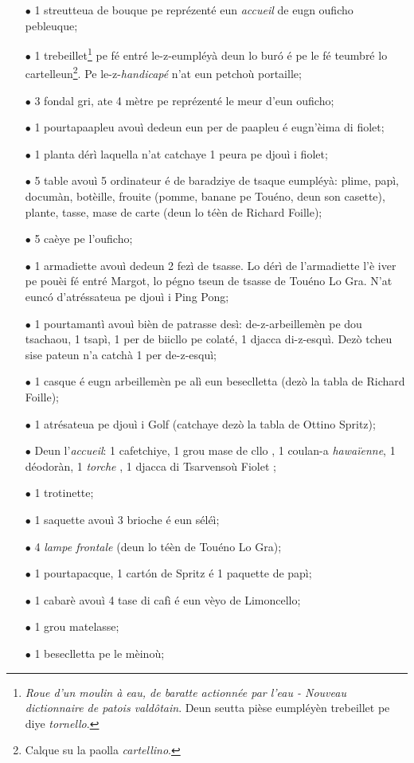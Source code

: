 \Scenographie
\begin{itemize}
\item[$\bullet$] 1 streutteua de bouque pe reprézenté eun \textit{accueil} de eugn ouficho pebleuque;
\item[$\bullet$] 1 trebeillet\footnote{ \textit{Roue d'un moulin à eau, de baratte actionnée par l'eau - Nouveau dictionnaire de patois vald\^otain}. Deun seutta pièse eumpléyèn trebeillet pe diye \textit{tornello}.} pe fé entré le-z-eumpléyà deun lo bur\'o é pe le fé teumbré lo cartelleun\footnote{ Calque su la paolla \textit{cartellino}.}. Pe le-z-\textit{handicapé} n'at eun petchoù portaille;
\item[$\bullet$] 3 fondal gri, ate 4 mètre pe reprézenté le meur d'eun ouficho;
\item[$\bullet$] 1 pourtapaapleu avouì dedeun eun per de paapleu é eugn'èima di fiolet;
\item[$\bullet$] 1 planta dérì laquella n'at catchaye 1 peura pe djouì i fiolet;
\item[$\bullet$] 5 table avouì 5 ordinateur é de baradziye de tsaque eumpléyà: plime, papì, documàn, botèille, frouite (pomme, banane pe Touéno, deun son casette), plante, tasse, mase de carte (deun lo téèn de Richard Foille);
\item[$\bullet$] 5 caèye pe l'ouficho;
\item[$\bullet$] 1 armadiette avouì dedeun 2 fezì de tsasse. Lo dérì de l'armadiette l'è iver pe pouèi fé entré Margot, lo pégno tseun de tsasse de Touéno Lo Gra. N'at eunc\'o d'atréssateua pe djouì i Ping Pong;
\item[$\bullet$] 1 pourtamantì avouì bièn de patrasse desì: de-z-arbeillemèn pe dou tsachaou, 1 tsapì, 1 per de biicllo pe colaté, 1 djacca di-z-esquì.  Dezò tcheu sise pateun n'a catchà 1 per de-z-esquì;
\item[$\bullet$] 1 casque é eugn arbeillemèn pe alì eun beseclletta (dezò la tabla de Richard Foille);
\item[$\bullet$] 1 atrésateua pe djouì i Golf (catchaye dezò la tabla de Ottino Spritz);
\item[$\bullet$] Deun l'\textit{accueil}: 1 cafetchiye, 1 grou mase de cllo , 1 coulan-a \textit{hawaïenne}, 1 déodoràn, 1 \textit{torche} \torcia, 1 djacca di Tsarvensoù Fiolet ;
\item[$\bullet$] 1 trotinette;
\item[$\bullet$] 1 saquette avouì 3 brioche é eun séléì;
\item[$\bullet$] 4 \textit{lampe frontale} (deun lo téèn de Touéno Lo Gra);
\item[$\bullet$] 1 pourtapacque, 1 cart\'on de Spritz é 1 paquette de papì;
\item[$\bullet$] 1 cabarè avouì 4 tase di cafì é eun vèyo de Limoncello;
\item[$\bullet$] 1 grou matelasse;
\item[$\bullet$] 1 beseclletta pe le mèinoù;
\end{itemize}

